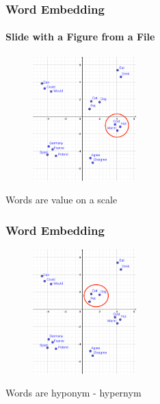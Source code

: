 \begin{frame}
	\frametitle{Word Embedding}
		\framesubtitle{Slide with a Figure from a File}

	\begin{figure}
		\includegraphics[width=4cm]{./figures/Group_scale}

	\end{figure}
		\begin{center}
		{Words are value on a scale}
		\end{center}
	\vspace{-0.5cm}

\end{frame}

\begin{frame}
	\frametitle{Word Embedding}

	\begin{figure}
		\includegraphics[width=4cm]{./figures/Group_hyponym}
	\end{figure}
		\begin{center}
		{Words are hyponym - hypernym}
		\end{center}
	\vspace{-0.5cm}

\end{frame}

